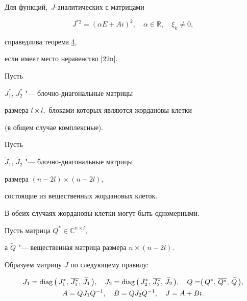 \smallskip



\begin{lemma}[4]Для функций$,$ $J$-аналитических с матрицами

 $$

 J^{*2}=(\alpha E+Ai)^2,\quad

 \alpha\in\mathbb{R},\quad \xi_k\ne 0,

 $$

  справедлива   теорема {\rm \hyperlink{nik:th4}{4},} 

  если имеет место  неравенство $\eqref{22n}.$

  \end{lemma}



\smallskip




Пусть

 $J^*_1$, $J^*_2$ "--- блочно-диагональные матрицы

  размера $l\times l,$ блоками которых являются жордановы клетки

 (в общем случае комплексные). 

 Пусть

 $\widetilde{J}_1$, $\widetilde{J}_2$ "--- блочно-диагональные матрицы

 размера $(n-2l)\times(n-2l), $

  состоящие  из вещественных жордановых клеток.

   В обеих случаях жордановы клетки могут быть одномерными.

      Пусть матрица $Q^*\in\mathbb{C}^{n\times l},$

а $\widetilde{Q}$ "--- вещественная матрица размера $n\times (n-2l).$

     Образуем матрицу $J$ по следующему правилу:

        \begin{multline}

         J_1={\rm diag}\,\bigr(\,

 J^*_1,\,\overline{J^*_1},\,\widetilde{J}_1\,\bigr),\quad

J_2={\rm diag}\,\bigr(\,

 J^*_2,\,\overline{J^*_2},\,\widetilde{J}_2\,\bigr),\quad

   Q=\bigr(\,

 Q^*,\,\overline{Q^*},\,\widetilde{Q}\,\bigr),\\

  A=QJ_1Q^{-1},\quad B=QJ_2Q^{-1},\quad J=A+Bi.

   \label{23n}

\end{multline}





